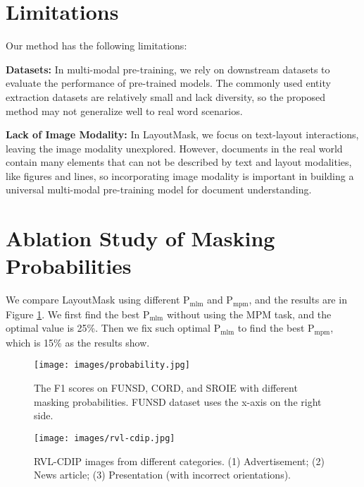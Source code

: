 \documentclass[11pt]{article}
\begin{document}
\section*{Limitations}

Our method has the following limitations:

\noindent\textbf{Datasets:}
In multi-modal pre-training, we rely on downstream datasets to evaluate the performance of pre-trained models.
The commonly used entity extraction datasets are relatively small and lack diversity, so the proposed method may not generalize well to real word scenarios.

\noindent\textbf{Lack of Image Modality:}
In LayoutMask, we focus on text-layout interactions, leaving the image modality unexplored.
However, documents in the real world contain many elements that can not be described by text and layout modalities, like figures and lines, so incorporating image modality is important in building a universal multi-modal pre-training model for document understanding.  






\newpage
\appendix

\section{Ablation Study of Masking Probabilities}
\label{appendix:masking-p}
We compare LayoutMask using different $\mathrm{P}_\mathrm{mlm}$ and $\mathrm{P}_\mathrm{mpm}$, and the results are in Figure \ref{fig:probability}.
We first find the best $\mathrm{P}_\mathrm{mlm}$ without using the MPM task, and the optimal value is 25\%. 
Then we fix such optimal $\mathrm{P}_\mathrm{mlm}$ to find the best $\mathrm{P}_\mathrm{mpm}$, which is 15\% as the results show.


\label{sec:ablation-method}
\begin{figure}[!tb]
	\centering
	\texttt{[image: images/probability.jpg]}
	\caption{The F1 scores on FUNSD, CORD, and SROIE with different masking probabilities. FUNSD dataset uses the x-axis on the right side.}
	\label{fig:probability}
\end{figure}

\begin{figure}[!tb]
	\centering
	\texttt{[image: images/rvl-cdip.jpg]}
	\caption{ RVL-CDIP images from different categories. (1) Advertisement; (2) News article; (3) Presentation (with incorrect orientations).}
	\label{fig:rvl-cdip}
\end{figure}
\end{document}
